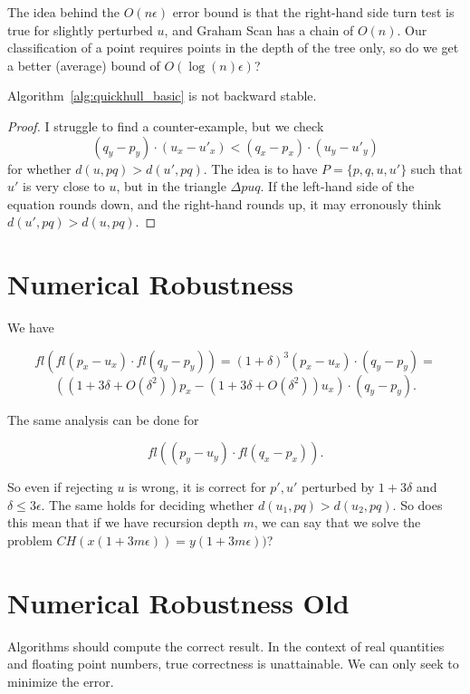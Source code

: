 The idea behind the $O(n \epsilon)$ error bound is that the right-hand side
turn test is true for slightly perturbed $u$, and Graham Scan has a chain of
$O(n)$. Our classification of a point requires points in the depth of the tree
only, so do we get a better (average) bound of $O(\log(n) \epsilon)$?

\begin{prop}
    Algorithm~\ref{alg:quickhull_basic} is not backward stable.
\end{prop}

\begin{proof}
    I struggle to find a counter-example, but we check 
    $$(q_y - p_y) \cdot (u_x - u'_x) < (q_x - p_x) \cdot (u_y - u'_y)$$
    for whether $d(u, pq) > d(u', pq)$. The idea is to have 
    $P = \{p, q, u, u'\}$ such that $u'$ is very close to $u$, but in the 
    triangle $\Delta puq$. If the left-hand side of the equation rounds down,
    and the right-hand rounds up, it may erronously think 
    $d(u', pq) > d(u, pq)$.


\end{proof}

\section{Numerical Robustness}

We have 

$$fl(fl(p_x - u_x) \cdot fl(q_y - p_y)) = 
(1 + \delta)^3 (p_x - u_x) \cdot (q_y - p_y) = $$
$$((1 + 3\delta + O(\delta^2))p_x - (1 + 3\delta + O(\delta^2))u_x) \cdot (q_y - p_y).$$

The same analysis can be done for

$$fl((p_y - u_y) \cdot fl(q_x - p_x)).$$

So even if rejecting $u$ is wrong, it is correct for $p', u'$ perturbed
by $1 + 3\delta$ and $\delta \leq 3 \epsilon$.
The same holds for deciding whether $d(u_1, pq) > d(u_2, pq)$. So does this
mean that if we have recursion depth $m$, we can say that we solve the problem
$CH(x(1 + 3m\epsilon)) = y(1 + 3m\epsilon))$?

\section{Numerical Robustness Old}




Algorithms should compute the correct result. In the context of real quantities
and floating point numbers, true correctness is unattainable. We can only
seek to minimize the error. 

